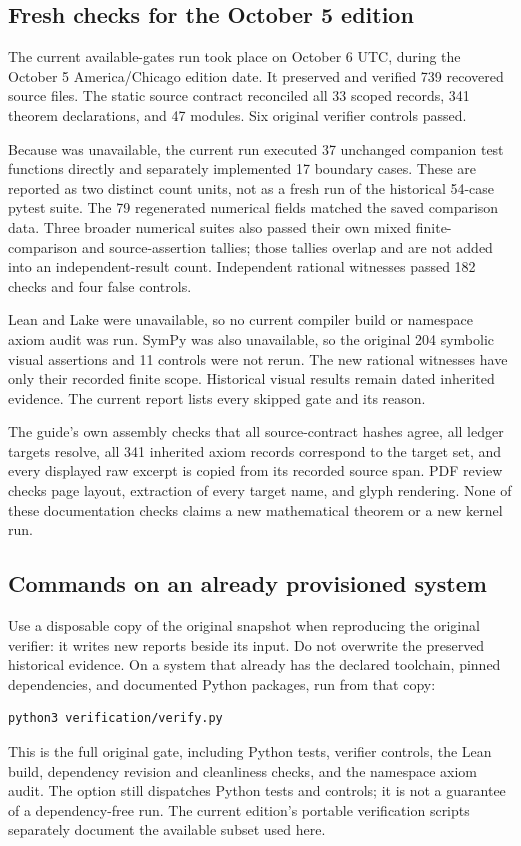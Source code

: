 \subsection{Fresh checks for the October 5 edition}
The current available-gates run took place on October 6 UTC, during the October 5 America/Chicago edition date. It preserved and verified 739 recovered source files. The static source contract reconciled all 33 scoped records, 341 theorem declarations, and 47 modules. Six original verifier controls passed.

Because  was unavailable, the current run executed 37 unchanged companion test functions directly and separately implemented 17 boundary cases. These are reported as two distinct count units, not as a fresh run of the historical 54-case pytest suite. The 79 regenerated numerical fields matched the saved comparison data. Three broader numerical suites also passed their own mixed finite-comparison and source-assertion tallies; those tallies overlap and are not added into an independent-result count. Independent rational witnesses passed 182 checks and four false controls.

Lean and Lake were unavailable, so no current compiler build or namespace axiom audit was run. SymPy was also unavailable, so the original 204 symbolic visual assertions and 11 controls were not rerun. The new rational witnesses have only their recorded finite scope. Historical visual results remain dated inherited evidence. The current report lists every skipped gate and its reason.

The guide's own assembly checks that all source-contract hashes agree, all ledger targets resolve, all 341 inherited axiom records correspond to the target set, and every displayed raw excerpt is copied from its recorded source span. PDF review checks page layout, extraction of every target name, and glyph rendering. None of these documentation checks claims a new mathematical theorem or a new kernel run.

\subsection{Commands on an already provisioned system}
Use a disposable copy of the original snapshot when reproducing the original verifier: it writes new reports beside its input. Do not overwrite the preserved historical evidence. On a system that already has the declared toolchain, pinned dependencies, and documented Python packages, run from that copy:
\begin{Verbatim}[fontsize=\small,frame=leftline,breaklines=true]
python3 verification/verify.py
\end{Verbatim}
This is the full original gate, including Python tests, verifier controls, the Lean build, dependency revision and cleanliness checks, and the namespace axiom audit. The  option still dispatches Python tests and controls; it is not a guarantee of a dependency-free run. The current edition's portable verification scripts separately document the available subset used here.

